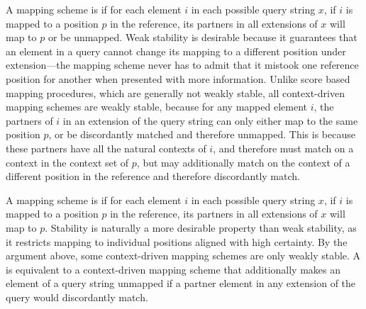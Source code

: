 A mapping scheme is  
if for each element $i$ in each possible query string $x$, if $i$ is mapped to a position $p$ in the reference, its partners in all extensions of $x$ will map to $p$ or be unmapped.
Weak stability is desirable because it guarantees that an element in a query cannot change its mapping to a different position under extension---the mapping scheme never has to admit that it mistook one reference position for another when presented with more information. Unlike score based mapping procedures, which are generally not weakly stable, all context-driven mapping schemes are weakly stable, because for any mapped element $i$, the partners of $i$ in an extension of the query string can only either map to the same position $p$, or be discordantly matched and therefore unmapped. This is because these partners have all the natural contexts of $i$, and therefore must match on a context in the context set of $p$, but may additionally match on the context of a different position in the reference and therefore discordantly match.

A mapping scheme is  
if for each element $i$ in each possible query string $x$, if $i$ is mapped to a position $p$ in the reference, its partners in all extensions of $x$ will map to $p$. Stability is naturally a more desirable property than weak stability, as it restricts mapping to individual positions aligned with high certainty.
By the argument above, some context-driven mapping schemes are only weakly stable. A  is equivalent to a context-driven mapping scheme that additionally makes an element of a query string unmapped if a partner element in any extension of the query would discordantly match. 

